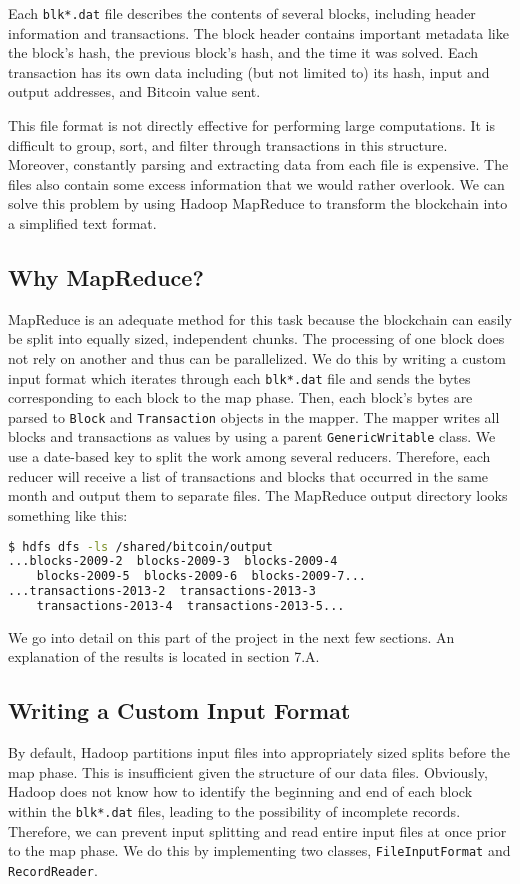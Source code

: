 \documentclass[9pt,twocolumn,twoside]{idsi}
\begin{document}
Each \lstinline{blk*.dat} file describes the contents of several blocks, including header information and transactions. The block header contains important metadata like the block's hash, the previous block's hash, and the time it was solved. Each transaction has its own data including (but not limited to) its hash, input and output addresses, and Bitcoin value sent.

This file format is not directly effective for performing large computations. It is difficult to group, sort, and filter through transactions in this structure. Moreover, constantly parsing and extracting data from each file is expensive. The files also contain some excess information that we would rather overlook. We can solve this problem by using Hadoop MapReduce to transform the blockchain into a simplified text format.

\subsection{Why MapReduce?}
MapReduce is an adequate method for this task because the blockchain can easily be split into equally sized, independent chunks. The processing of one block does not rely on another and thus can be parallelized. We do this by writing a custom input format which iterates through each \lstinline{blk*.dat} file and sends the bytes corresponding to each block to the map phase. Then, each block's bytes are parsed to \lstinline{Block} and \lstinline{Transaction} objects in the mapper. The mapper writes all blocks and transactions as values by using a parent \lstinline{GenericWritable} class. We use a date-based key to split the work among several reducers. Therefore, each reducer will receive a list of transactions and blocks that occurred in the same month and output them to separate files. The MapReduce output directory looks something like this:

\begin{lstlisting}[language=bash]
 $ hdfs dfs -ls /shared/bitcoin/output
...blocks-2009-2  blocks-2009-3  blocks-2009-4
    blocks-2009-5  blocks-2009-6  blocks-2009-7...
...transactions-2013-2  transactions-2013-3
    transactions-2013-4  transactions-2013-5...
\end{lstlisting}

We go into detail on this part of the project in the next few sections. An explanation of the results is located in section 7.A.

\subsection{Writing a Custom Input Format}
By default, Hadoop partitions input files into appropriately sized splits before the map phase. This is insufficient given the structure of our data files. Obviously, Hadoop does not know how to identify the beginning and end of each block within the \lstinline{blk*.dat} files, leading to the possibility of incomplete records. Therefore, we can prevent input splitting and read entire input files at once prior to the map phase. We do this by implementing two classes, \lstinline{FileInputFormat} and \lstinline{RecordReader}.
\end{document}
